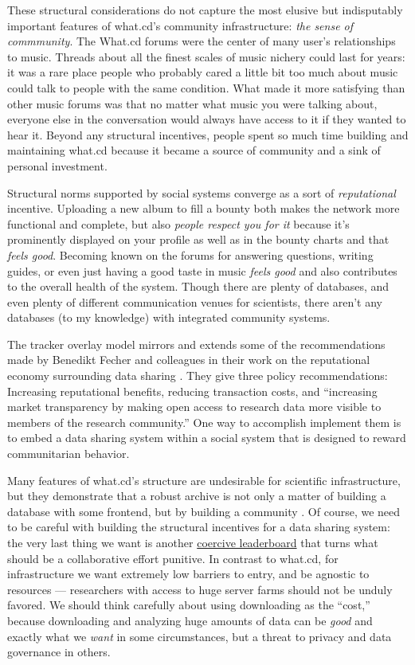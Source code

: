 \documentclass[10pt]{article}
\begin{document}
\begin{multicols}{2}
These structural considerations do not capture the most elusive but
indisputably important features of what.cd's community infrastructure:
\emph{the sense of commmunity}. The What.cd forums were the center of
many user's relationships to music. Threads about all the finest scales
of music nichery could last for years: it was a rare place people who
probably cared a little bit too much about music could talk to people
with the same condition. What made it more satisfying than other music
forums was that no matter what music you were talking about, everyone
else in the conversation would always have access to it if they wanted
to hear it. Beyond any structural incentives, people spent so much time
building and maintaining what.cd because it became a source of community
and a sink of personal investment.

Structural norms supported by social systems converge as a sort of
\emph{reputational} incentive. Uploading a new album to fill a bounty
both makes the network more functional and complete, but also
\emph{people respect you for it} because it's prominently displayed on
your profile as well as in the bounty charts and that \emph{feels good}.
Becoming known on the forums for answering questions, writing guides, or
even just having a good taste in music \emph{feels good} and also
contributes to the overall health of the system. Though there are plenty
of databases, and even plenty of different communication venues for
scientists, there aren't any databases (to my knowledge) with integrated
community systems.

The tracker overlay model mirrors and extends some of the
recommendations made by Benedikt Fecher and colleagues in their work on
the reputational economy surrounding data sharing \cite{fecherReputationEconomyHow2017} . They give three policy
recommendations: Increasing reputational benefits, reducing transaction
costs, and ``increasing market transparency by making open access to
research data more visible to members of the research community.'' One
way to accomplish implement them is to embed a data sharing system
within a social system that is designed to reward communitarian
behavior.

Many features of what.cd's structure are undesirable for scientific
infrastructure, but they demonstrate that a robust archive is not only a
matter of building a database with some frontend, but by building a
community \cite{brossCommunityCollaborationContribution2013} . Of
course, we need to be careful with building the structural incentives
for a data sharing system: the very last thing we want is another
\href{https://etiennelebel.com/cs/t-leaderboard/t-leaderboard.html}{coercive
leaderboard} that turns what should be a collaborative effort punitive.
In contrast to what.cd, for infrastructure we want extremely low
barriers to entry, and be agnostic to resources --- researchers with
access to huge server farms should not be unduly favored. We should
think carefully about using downloading as the ``cost,'' because
downloading and analyzing huge amounts of data can be \emph{good} and
exactly what we \emph{want} in some circumstances, but a threat to
privacy and data governance in others.


\end{multicols}
\end{document}
